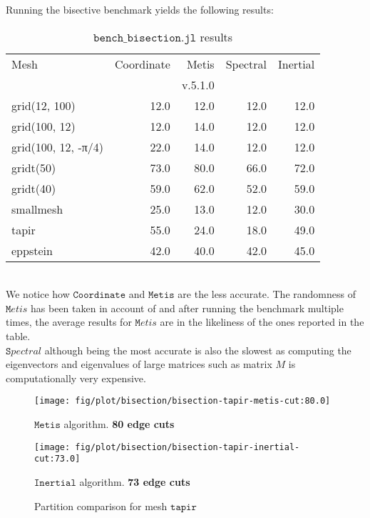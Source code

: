 \documentclass[unicode,11pt,a4paper,oneside,numbers=endperiod,openany]{scrartcl}
\begin{document}
\clearpage
Running the bisective benchmark yields the following results:
\begin{table}[h!]
\caption{$\texttt {bench\_bisection.jl}$ results}
\centering
\begin{tabular}{l|r|r|r|r} \hline\hline 
                Mesh &  Coordinate &    Metis &  Spectral &  Inertial \\
                     &             &  v.5.1.0 &           &          \\
\hline grid(12, 100) &        12.0 &     12.0 &      12.0 &      12.0 \\
       grid(100, 12) &        12.0 &     14.0 &      12.0 &      12.0 \\
 grid(100, 12, -π/4) &        22.0 &     14.0 &      12.0 &      12.0 \\
           gridt(50) &        73.0 &     80.0 &      66.0 &      72.0 \\
           gridt(40) &        59.0 &     62.0 &      52.0 &      59.0 \\
           smallmesh &        25.0 &     13.0 &      12.0 &      30.0 \\
               tapir &        55.0 &     24.0 &      18.0 &      49.0 \\
            eppstein &        42.0 &     40.0 &      42.0 &      45.0 \\
\hline \hline
\end{tabular}
\label{table:bisection}
\end{table}\\
We notice how $\texttt {Coordinate}$ and $\texttt{Metis}$ are the less accurate. The randomness of $\texttt Metis$ has been taken in account of and after running the benchmark multiple times, the average results for $\texttt Metis$ are in the likeliness of the ones reported in the table.\\
$\texttt Spectral$ although being the most accurate is also the slowest as computing the eigenvectors and eigenvalues of large matrices such as matrix $M$ is computationally very expensive.
\begin{figure}[h!]
    \begin{minipage}{0.5\textwidth}
        \centering
        \texttt{[image: fig/plot/bisection/bisection-tapir-metis-cut:80.0]}
        \caption{$\texttt {Metis}$ algorithm. \textbf{80 edge cuts}}
    \end{minipage}
        \begin{minipage}{0.5\textwidth}
        \centering
        \texttt{[image: fig/plot/bisection/bisection-tapir-inertial-cut:73.0]}
        \caption{$\texttt {Inertial}$ algorithm. \textbf{73 edge cuts}}
    \end{minipage}
    \caption*{Partition comparison for mesh $\texttt {tapir}$}
\end{figure}\\
\end{document}
